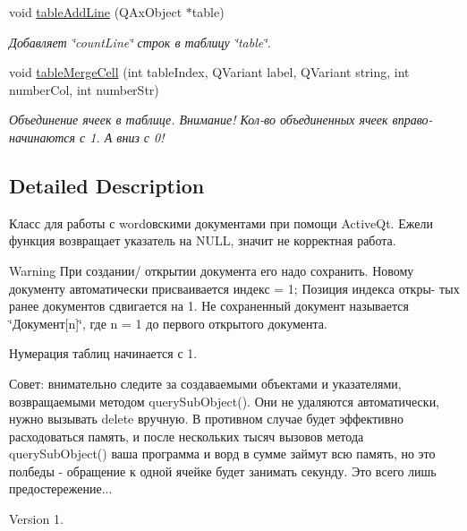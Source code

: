 \begin{DoxyCompactItemize}
void \hyperlink{class_active_word_a54b0d306d9ba5217f76b45944d3fd5c3}{table\+Add\+Line} (Q\+Ax\+Object $\ast$table)
\begin{DoxyCompactList}\small\item\em Добавляет \char`\"{}count\+Line\char`\"{} строк в таблицу \char`\"{}table\char`\"{}. \end{DoxyCompactList}\item 
\mbox{\label{class_active_word_ad0789fdf2772fc245ed7c8d6ec190db3}} 
void \hyperlink{class_active_word_ad0789fdf2772fc245ed7c8d6ec190db3}{table\+Merge\+Cell} (int table\+Index, Q\+Variant label, Q\+Variant string, int number\+Col, int number\+Str)
\begin{DoxyCompactList}\small\item\em Объединение ячеек в таблице. Внимание! Кол-\/во объединенных ячеек вправо-\/ начинаются с 1. А вниз с 0! \end{DoxyCompactList}\end{DoxyCompactItemize}


\subsection{Detailed Description}
Класс для работы с word\textquotesingle{}овскими документами при помощи Active\+Qt. Ежели функция возвращает указатель на N\+U\+LL, значит не корректная работа. 

\begin{DoxyWarning}{Warning}
При создании/ открытии документа его надо сохранить. Новому документу автоматически присваивается индекс = 1; Позиция индекса откры-\/ тых ранее документов сдвигается на 1. Не сохраненный документ называется \char`\"{}Документ\mbox{[}n\mbox{]}\char`\"{}, где n = 1 до первого открытого документа.
\end{DoxyWarning}
Нумерация таблиц начинается с 1.

Совет\+: внимательно следите за создаваемыми объектами и указателями, возвращаемыми методом query\+Sub\+Object(). Они не удаляются автоматически, нужно вызывать delete вручную. В противном случае будет эффективно расходоваться память, и после нескольких тысяч вызовов метода query\+Sub\+Object() ваша программа и ворд в сумме займут всю память, но это полбеды -\/ обращение к одной ячейке будет занимать секунду. Это всего лишь предостережение...

\begin{DoxyVersion}{Version}
1. 
\end{DoxyVersion}


